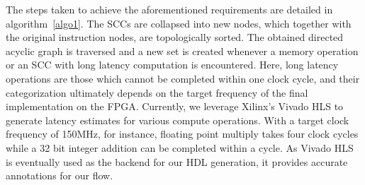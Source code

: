 \documentclass{sig-alternate}
\begin{document}
The steps taken to achieve the aforementioned requirements are detailed
in algorithm~\ref{algo1}.
The SCCs are collapsed into new nodes, which together with the original instruction nodes, are topologically
sorted. The obtained directed acyclic graph is traversed and a new set is created whenever a memory operation
or an SCC with long latency computation
is encountered. Here, long latency operations are those which cannot be completed within
one clock cycle, and
their categorization ultimately depends on the target frequency
of the final implementation on the FPGA. Currently, we
leverage Xilinx's Vivado HLS to generate latency estimates for
various compute operations. With a target clock frequency of
150MHz, for instance, floating point multiply takes four clock
cycles while a 32 bit integer addition can be completed within
a cycle. As Vivado HLS is eventually used as the backend for
our HDL generation, it provides accurate annotations for our
flow.
\end{document}
